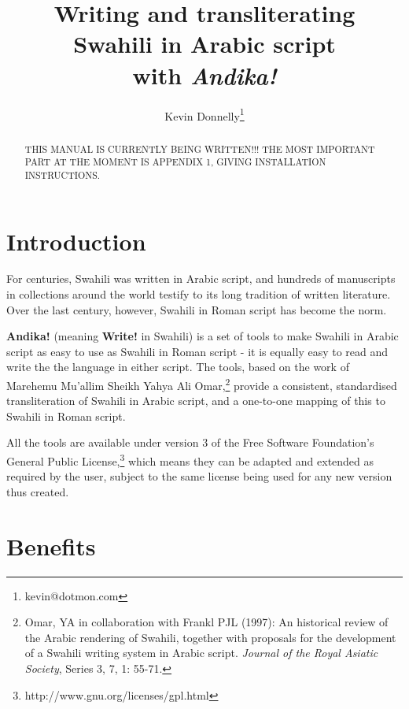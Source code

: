 \documentclass[a4paper,10pt]{article}
\title{\textbf{Writing and transliterating\\Swahili in Arabic script\\with \textit{Andika!}}}
\author{Kevin Donnelly\thanks{kevin@dotmon.com}}
\date{}
\begin{document}
\maketitle

\begin{abstract}
THIS MANUAL IS CURRENTLY BEING WRITTEN!!!  THE MOST IMPORTANT PART AT THE MOMENT IS APPENDIX 1, GIVING INSTALLATION INSTRUCTIONS. 
\end{abstract}

\frenchspacing

\section{Introduction}
\label{s:intro}

For centuries, Swahili was written in Arabic script, and hundreds of manuscripts in collections around the world testify to its long tradition of written literature. Over the last century, however, Swahili in Roman script has become the norm.

\textbf{Andika!} (meaning \textbf{Write!} in Swahili) is a set of tools to make Swahili in Arabic script as easy to use as Swahili in Roman script - it is equally easy to read and write the the language in either script. The tools, based on the work of Marehemu Mu'allim Sheikh Yahya Ali Omar,\footnote{Omar, YA in collaboration with Frankl PJL (1997): An historical review of the Arabic rendering of Swahili, together with proposals for the development of a Swahili writing system in Arabic script. \textit{Journal of the Royal Asiatic Society}, Series 3, 7, 1: 55-71. } provide a consistent, standardised transliteration of Swahili in Arabic script, and a one-to-one mapping of this to Swahili in Roman script.

All the tools are available under version 3 of the Free Software Foundation's General Public License,\footnote{http://www.gnu.org/licenses/gpl.html} which means they can be adapted and extended as required by the user, subject to the same license being used for any new version thus created.


\section{Benefits}
\label{s:benefits}
\end{document}
